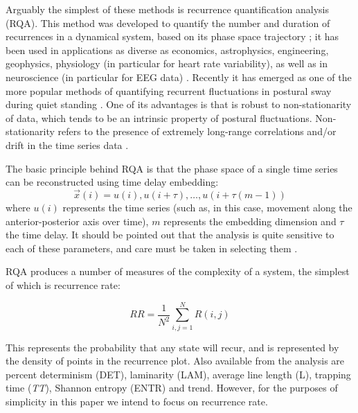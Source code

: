 \documentclass[11pt]{article}
\begin{document}
\begin{linenumbers}
Arguably the simplest of these methods is recurrence quantification analysis (RQA). This method was developed to quantify the number and duration of recurrences in a dynamical system, based on its phase space trajectory \cite{Zbilut:1992cz, Marwan:2007km}; it has been used in applications as diverse as economics, astrophysics, engineering, geophysics, physiology (in particular for heart rate variability), as well as in neuroscience (in particular for EEG data) \cite{Becker:2010iy, Hamadene:2005br, Huang:2006eq, Mesin:2013in, Talebi:2010gp, Zhu:2008bn}. Recently it has emerged as one of the more popular methods of quantifying recurrent fluctuations in postural sway during quiet standing \cite{Riley:2003vh, Ramdani:2013da,Tallon:2013vq}. One of its advantages is that is robust to non-stationarity of data, which tends to be an intrinsic property of postural fluctuations. Non-stationarity refers to the presence of extremely long-range correlations and/or drift in the time series data \cite{Duarte:2000vh}. %

The basic principle behind RQA is that the phase space of a single time series can be reconstructed using time delay embedding: 
\begin{equation}\label{eq:2}
\vec{x}(i) = u(i), u(i+\tau), \dotsc, u(i+\tau (m - 1))
\end{equation}
where $u(i)$ represents the time series (such as, in this case, movement along the anterior-posterior axis over time), $m$ represents the embedding dimension and $\tau$ the time delay. It should be pointed out that the analysis is quite sensitive to each of these parameters, and care must be taken in selecting them \cite{Marwan:2011tf, Hasson:2008ww}. 


RQA produces a number of measures of the complexity of a system, the simplest of which is recurrence rate:

\begin{equation}\label{eq:3}
RR = \frac{1}{N^2} \sum_{i, j=1}^{N} R(i,j)
\end{equation}

This represents the probability that any state will recur, and is represented by the density of points in the recurrence plot. Also available from the analysis are percent determinism (DET), laminarity (LAM), average line length (L), trapping time (\textit{TT}), Shannon entropy (ENTR) and trend. However, for the purposes of simplicity in this paper we intend to focus on recurrence rate. 


\end{linenumbers}
\end{document}
